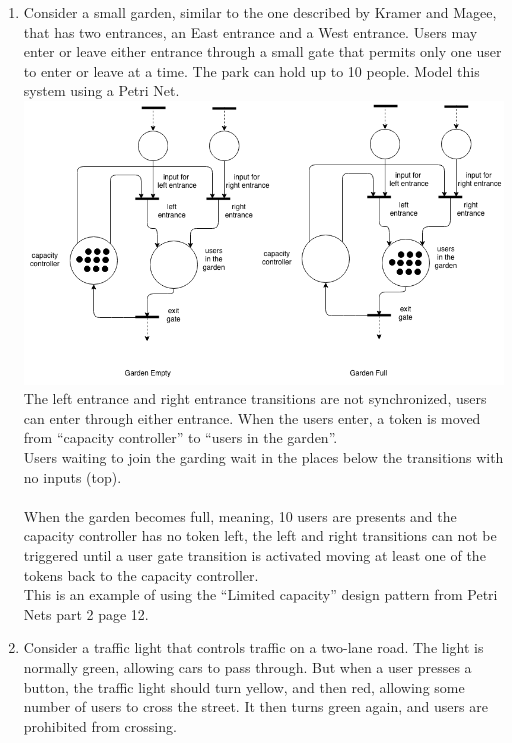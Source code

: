 \documentclass{article}
\begin{document}



\begin{enumerate}

\item Consider a small garden, similar to the one described by Kramer and Magee, that has two entrances, an East entrance and a West entrance. Users may enter or leave either entrance through a small gate that permits only one user to enter or leave at a time. The park can hold up to 10 people. Model this system using a Petri Net. \\
  \includegraphics[scale=0.5]{hw13p1.png} \\
  The left entrance and right entrance transitions are not synchronized, users can enter through either entrance. When the users enter, a token is moved from ``capacity controller'' to ``users in the garden''. \\
  Users waiting to join the garding wait in the places below the transitions with no inputs (top). \\
  \\
  When the garden becomes full, meaning, 10 users are presents and the capacity controller has no token left, the left and right transitions can not be triggered until a user gate transition is activated moving at least one of the tokens back to the capacity controller.
\\
This is an example of using the ``Limited capacity'' design pattern from Petri Nets part 2 page 12.   
\item Consider a traffic light that controls traffic on a two-lane road. The light is normally green, allowing cars to pass through. But when a user presses a button, the traffic light should turn yellow, and then red, allowing some number of users to cross the street. It then turns green again, and users are prohibited from crossing.

\end{enumerate}
\end{document}
